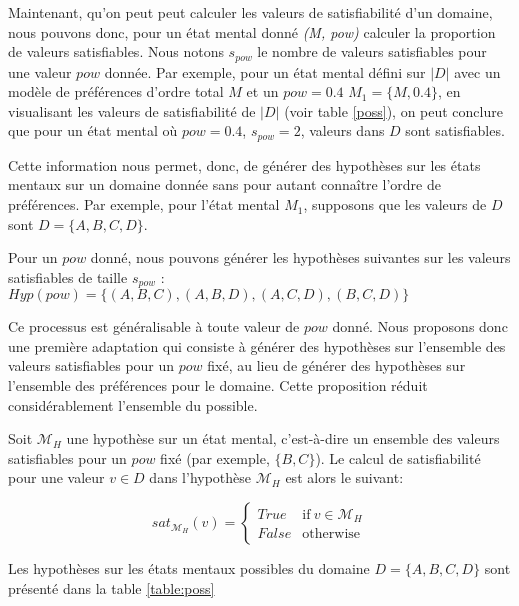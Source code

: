 \documentclass[runningheads,a4paper]{llncs}
\begin{document}
Maintenant, qu'on peut peut calculer les valeurs de satisfiabilité d'un domaine, nous pouvons donc, pour un état mental donné \emph{(M, pow)} calculer la proportion de valeurs satisfiables. Nous notons $s_{pow}$ le nombre de valeurs satisfiables pour une valeur $pow$ donnée. 
Par exemple, pour un état mental défini sur $|D|$ avec un modèle de préférences d'ordre total $M$ et un $pow =0.4$ $M_1 = \{M, 0.4\}$, en visualisant les valeurs de satisfiabilité de $|D|$ (voir table \ref{poss}), on peut conclure que pour un état mental où $pow =0.4$, $s_{pow} =2$, valeurs dans $D$ sont satisfiables. 

Cette information nous permet, donc, de générer des hypothèses sur les états mentaux sur un domaine donnée sans pour autant connaître l'ordre de préférences.
Par exemple, pour l'état mental $M_1$,  supposons que les valeurs de $D$ sont $D =\{A, B, C, D\}$.

Pour un $pow$ donné, nous pouvons générer les hypothèses suivantes sur les valeurs satisfiables de taille $s_{pow}$ : 
$Hyp(pow) = \{(A,B,C) , (A,B,D), (A,C,D), (B,C,D) \}$

Ce processus est généralisable à toute valeur de $pow$ donné. Nous proposons donc une première adaptation qui consiste à générer des hypothèses sur l'ensemble des valeurs satisfiables pour un $pow$ fixé, au lieu de générer des hypothèses sur l'ensemble des préférences pour le domaine. Cette proposition réduit considérablement l'ensemble du possible.

Soit $\mathcal{M}_H$ une hypothèse sur un état mental, c'est-à-dire un ensemble des valeurs satisfiables pour un $pow$ fixé (par exemple, $\{B,C\}$). Le calcul de satisfiabilité pour une valeur $v\in D$ dans l'hypothèse $\mathcal{M}_H$ est alors le suivant: 

\begin{equation}
sat_{\mathcal{M}_H}(v)= \left\{\begin{array}{ll}
True	 & \mathrm{if\ }  v \in \mathcal{M}_H\\
False & \mathrm{otherwise}
\end{array}\right.
\end{equation}

Les hypothèses sur les états mentaux possibles du domaine $D =\{A, B, C, D\}$ sont présenté dans la table \ref{table:poss} 
\end{document}
